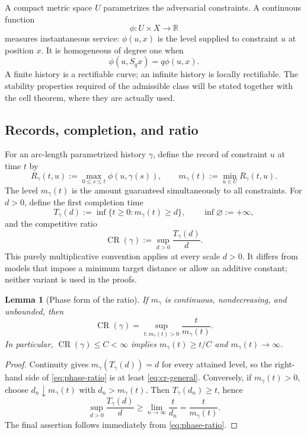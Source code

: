 \documentclass[10pt,a4paper]{article}
\newtheorem{lemma}[lemma]{Lemma}
\theoremstyle{definition}
\theoremstyle{remark}
\DeclareMathOperator{\CR}{CR}
\newcommand{\R}{\mathbb{R}}
\begin{document}
A compact metric space $U$ parametrizes the adversarial constraints. A continuous function
\[
\phi:U\times X\longrightarrow\R
\]
measures instantaneous service: $\phi(u,x)$ is the level supplied to constraint $u$ at position $x$. It is homogeneous of degree one when
\begin{equation}
\phi(u,S_qx)=q\phi(u,x).
\label{eq:service-homogeneity}
\end{equation}
A finite history is a rectifiable curve; an infinite history is locally rectifiable. The stability properties required of the admissible class will be stated together with the cell theorem, where they are actually used.

\subsection{Records, completion, and ratio}
For an arc-length parametrized history $\gamma$, define the record of constraint $u$ at time $t$ by
\begin{equation}
R_\gamma(t,u):=\max_{0\le s\le t}\phi(u,\gamma(s)),
\qquad
m_\gamma(t):=\min_{u\in U}R_\gamma(t,u).
\label{eq:records}
\end{equation}
The level $m_\gamma(t)$ is the amount guaranteed simultaneously to all constraints. For $d>0$, define the first completion time
\begin{equation}
T_\gamma(d):=\inf\{t\ge0:m_\gamma(t)\ge d\},\qquad \inf\varnothing:=+\infty,
\label{eq:completion}
\end{equation}
and the competitive ratio
\begin{equation}
\CR(\gamma):=\sup_{d>0}\frac{T_\gamma(d)}{d}.
\label{eq:cr-general}
\end{equation}
This purely multiplicative convention applies at every scale $d>0$. It differs from models that impose a minimum target distance or allow an additive constant; neither variant is used in the proofs.

\begin{lemma}[Phase form of the ratio]
\label{lem:phase-ratio}
If $m_\gamma$ is continuous, nondecreasing, and unbounded, then
\begin{equation}
\CR(\gamma)=\sup_{t:m_\gamma(t)>0}\frac{t}{m_\gamma(t)}.
\label{eq:phase-ratio}
\end{equation}
In particular, $\CR(\gamma)\le C<\infty$ implies $m_\gamma(t)\ge t/C$ and $m_\gamma(t)\to\infty$.
\end{lemma}

\begin{proof}
Continuity gives $m_\gamma(T_\gamma(d))=d$ for every attained level, so the right-hand side of \eqref{eq:phase-ratio} is at least \eqref{eq:cr-general}. Conversely, if $m_\gamma(t)>0$, choose $d_n\downarrow m_\gamma(t)$ with $d_n>m_\gamma(t)$. Then $T_\gamma(d_n)\ge t$, hence
\[
\sup_{d>0}\frac{T_\gamma(d)}{d}
\ge \lim_{n\to\infty}\frac{t}{d_n}
=\frac{t}{m_\gamma(t)}.
\]
The final assertion follows immediately from \eqref{eq:phase-ratio}.
\end{proof}
\end{document}
